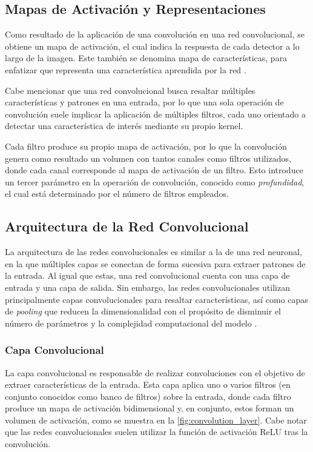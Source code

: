 \subsection{Mapas de Activación y Representaciones}
Como resultado de la aplicación de una convolución en una red convolucional, se obtiene
un mapa de activación, el cual indica la respuesta de cada detector a lo largo de la imagen.
Este también se denomina mapa de características, para enfatizar que representa una
característica aprendida por la red \parencite{lecun1998gradient}.
\medskip

Cabe mencionar que una red convolucional busca resaltar múltiples características y
patrones en una entrada, por lo que una sola operación de convolución suele implicar
la aplicación de múltiples filtros, cada uno orientado a detectar una característica de
interés mediante su propio kernel.
\medskip

Cada filtro produce su propio mapa de activación, por lo que la convolución genera
como resultado un volumen con tantos canales como filtros utilizados, donde cada canal
corresponde al mapa de activación de un filtro. Esto introduce un tercer parámetro en la
operación de convolución, conocido como \textit{profundidad}, el cual está determinado por
el número de filtros empleados.

\subsection{Arquitectura de la Red Convolucional}
La arquitectura de las redes convolucionales es similar a la de una red neuronal,
en la que múltiples capas se conectan de forma sucesiva para extraer patrones de la entrada.
Al igual que estas, una red convolucional cuenta con una capa de entrada y una capa de salida.
Sin embargo, las redes convolucionales utilizan principalmente capas convolucionales para
resaltar características, así como capas de \textit{pooling} que reducen la dimensionalidad
con el propósito de disminuir el número de parámetros y la complejidad computacional del modelo 
\parencite{o2015introduction}.

\subsubsection{Capa Convolucional}
La capa convolucional es responsable de realizar convoluciones con el objetivo de extraer
características de la entrada. Esta capa aplica uno o varios filtros (en conjunto conocidos
como banco de filtros) sobre la entrada, donde cada filtro produce un mapa de activación
bidimensional y, en conjunto, estos forman un volumen de activación, como se muestra en la
\cref{fig:convolution_layer}. Cabe notar que las redes convolucionales suelen utilizar 
la función de activación ReLU tras la convolución.
\medskip

